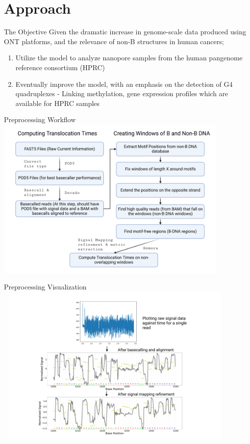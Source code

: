 \documentclass{beamer}
\begin{document}
	\section{Approach}
	
	\begin{frame}{The Objective}
		Given the dramatic increase in genome-scale data produced using ONT platforms, and the relevance of non-B structures in human cancers; \newline
		\begin{enumerate}
			\item Utilize the model to analyze nanopore samples from the human pangenome reference consortium (HPRC)
			\item Eventually improve the model, with an emphasis on the detection of G4 quadruplexes - Linking methylation, gene expression profiles which are available for HPRC samples\newline
		\end{enumerate}
	\end{frame}

	\begin{frame}{Preprocessing Workflow}
		\centering
		\includegraphics[width=11.5cm,height=8cm]{preprocessing_workflow.png}
		
	\end{frame}

	\begin{frame}{Preprocessing Visualization}
		\centering
		\includegraphics[width=12cm,height=8cm]{preprocess_results.png}
	\end{frame}
\end{document}
